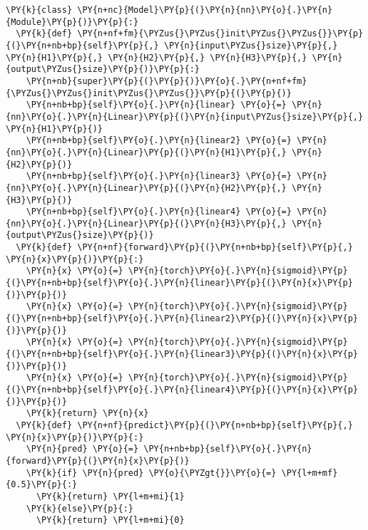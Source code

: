     \begin{tcolorbox}[breakable, size=fbox, boxrule=1pt, pad at break*=1mm,colback=cellbackground, colframe=cellborder]
\begin{Verbatim}[commandchars=\\\{\}]
\PY{k}{class} \PY{n+nc}{Model}\PY{p}{(}\PY{n}{nn}\PY{o}{.}\PY{n}{Module}\PY{p}{)}\PY{p}{:}
  \PY{k}{def} \PY{n+nf+fm}{\PYZus{}\PYZus{}init\PYZus{}\PYZus{}}\PY{p}{(}\PY{n+nb+bp}{self}\PY{p}{,} \PY{n}{input\PYZus{}size}\PY{p}{,} \PY{n}{H1}\PY{p}{,} \PY{n}{H2}\PY{p}{,} \PY{n}{H3}\PY{p}{,} \PY{n}{output\PYZus{}size}\PY{p}{)}\PY{p}{:}
    \PY{n+nb}{super}\PY{p}{(}\PY{p}{)}\PY{o}{.}\PY{n+nf+fm}{\PYZus{}\PYZus{}init\PYZus{}\PYZus{}}\PY{p}{(}\PY{p}{)}
    \PY{n+nb+bp}{self}\PY{o}{.}\PY{n}{linear} \PY{o}{=} \PY{n}{nn}\PY{o}{.}\PY{n}{Linear}\PY{p}{(}\PY{n}{input\PYZus{}size}\PY{p}{,} \PY{n}{H1}\PY{p}{)}
    \PY{n+nb+bp}{self}\PY{o}{.}\PY{n}{linear2} \PY{o}{=} \PY{n}{nn}\PY{o}{.}\PY{n}{Linear}\PY{p}{(}\PY{n}{H1}\PY{p}{,} \PY{n}{H2}\PY{p}{)}
    \PY{n+nb+bp}{self}\PY{o}{.}\PY{n}{linear3} \PY{o}{=} \PY{n}{nn}\PY{o}{.}\PY{n}{Linear}\PY{p}{(}\PY{n}{H2}\PY{p}{,} \PY{n}{H3}\PY{p}{)}
    \PY{n+nb+bp}{self}\PY{o}{.}\PY{n}{linear4} \PY{o}{=} \PY{n}{nn}\PY{o}{.}\PY{n}{Linear}\PY{p}{(}\PY{n}{H3}\PY{p}{,} \PY{n}{output\PYZus{}size}\PY{p}{)}
  \PY{k}{def} \PY{n+nf}{forward}\PY{p}{(}\PY{n+nb+bp}{self}\PY{p}{,} \PY{n}{x}\PY{p}{)}\PY{p}{:}
    \PY{n}{x} \PY{o}{=} \PY{n}{torch}\PY{o}{.}\PY{n}{sigmoid}\PY{p}{(}\PY{n+nb+bp}{self}\PY{o}{.}\PY{n}{linear}\PY{p}{(}\PY{n}{x}\PY{p}{)}\PY{p}{)}
    \PY{n}{x} \PY{o}{=} \PY{n}{torch}\PY{o}{.}\PY{n}{sigmoid}\PY{p}{(}\PY{n+nb+bp}{self}\PY{o}{.}\PY{n}{linear2}\PY{p}{(}\PY{n}{x}\PY{p}{)}\PY{p}{)}
    \PY{n}{x} \PY{o}{=} \PY{n}{torch}\PY{o}{.}\PY{n}{sigmoid}\PY{p}{(}\PY{n+nb+bp}{self}\PY{o}{.}\PY{n}{linear3}\PY{p}{(}\PY{n}{x}\PY{p}{)}\PY{p}{)}
    \PY{n}{x} \PY{o}{=} \PY{n}{torch}\PY{o}{.}\PY{n}{sigmoid}\PY{p}{(}\PY{n+nb+bp}{self}\PY{o}{.}\PY{n}{linear4}\PY{p}{(}\PY{n}{x}\PY{p}{)}\PY{p}{)}
    \PY{k}{return} \PY{n}{x}
  \PY{k}{def} \PY{n+nf}{predict}\PY{p}{(}\PY{n+nb+bp}{self}\PY{p}{,} \PY{n}{x}\PY{p}{)}\PY{p}{:}
    \PY{n}{pred} \PY{o}{=} \PY{n+nb+bp}{self}\PY{o}{.}\PY{n}{forward}\PY{p}{(}\PY{n}{x}\PY{p}{)}
    \PY{k}{if} \PY{n}{pred} \PY{o}{\PYZgt{}}\PY{o}{=} \PY{l+m+mf}{0.5}\PY{p}{:}
      \PY{k}{return} \PY{l+m+mi}{1}
    \PY{k}{else}\PY{p}{:} 
      \PY{k}{return} \PY{l+m+mi}{0}
\end{Verbatim}
\end{tcolorbox}


